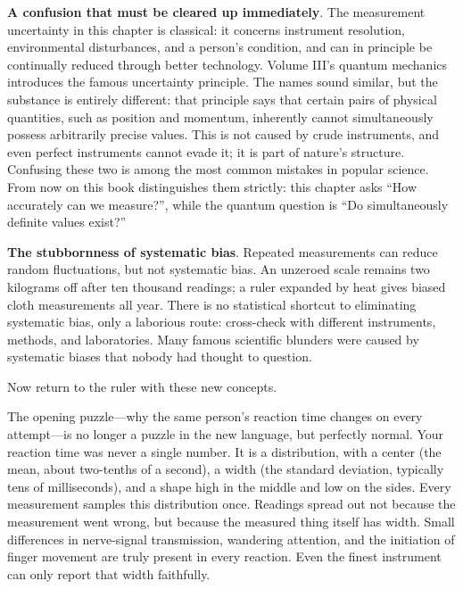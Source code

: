 \textbf{A confusion that must be cleared up immediately}. The measurement uncertainty in this chapter is classical: it concerns instrument resolution, environmental disturbances, and a person's condition, and can in principle be continually reduced through better technology. Volume III's quantum mechanics introduces the famous uncertainty principle. The names sound similar, but the substance is entirely different: that principle says that certain pairs of physical quantities, such as position and momentum, inherently cannot simultaneously possess arbitrarily precise values. This is not caused by crude instruments, and even perfect instruments cannot evade it; it is part of nature's structure. Confusing these two is among the most common mistakes in popular science. From now on this book distinguishes them strictly: this chapter asks ``How accurately can we measure?'', while the quantum question is ``Do simultaneously definite values exist?''

\textbf{The stubbornness of systematic bias}. Repeated measurements can reduce random fluctuations, but not systematic bias. An unzeroed scale remains two kilograms off after ten thousand readings; a ruler expanded by heat gives biased cloth measurements all year. There is no statistical shortcut to eliminating systematic bias, only a laborious route: cross-check with different instruments, methods, and laboratories. Many famous scientific blunders were caused by systematic biases that nobody had thought to question.


Now return to the ruler with these new concepts.

The opening puzzle---why the same person's reaction time changes on every attempt---is no longer a puzzle in the new language, but perfectly normal. Your reaction time was never a single number. It is a distribution, with a center (the mean, about two-tenths of a second), a width (the standard deviation, typically tens of milliseconds), and a shape high in the middle and low on the sides. Every measurement samples this distribution once. Readings spread out not because the measurement went wrong, but because the measured thing itself has width. Small differences in nerve-signal transmission, wandering attention, and the initiation of finger movement are truly present in every reaction. Even the finest instrument can only report that width faithfully.

